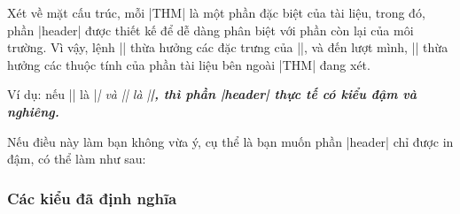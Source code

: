 Xét về mặt cấu trúc, mỗi |THM| là một phần đặc biệt
của tài liệu, trong đó, phần |header| được thiết kế để dễ dàng
phân biệt với phần còn lại của môi trường.
Vì vậy, lệnh |\theoremheaderfont| thừa hưởng các đặc trưng của |\theorembodyfont|,
và đến lượt mình, |\theorembodyfont| thừa hưởng các thuộc tính của phần
tài liệu bên ngoài |THM| đang xét.

\medskip
Ví dụ:
nếu |\theorembodyfont| là |\itshape| và |\theoremheaderfont| là |\bfseries|,
thì phần |header| thực tế có kiểu \textbf{\textit{đậm và nghiêng}}.

\medskip
Nếu điều này làm bạn không vừa ý, cụ thể là bạn muốn phần |header|
chỉ được in đậm, có thể làm như sau:
\begin{example}
  \theoremheaderfont{\normalfont\bfseries}
\end{example}


\subsubsection{\texorpdfstring{Các kiểu đã định nghĩa}{Cac kieu da dinh nghia}}

\label{sec:predefdstyles}

